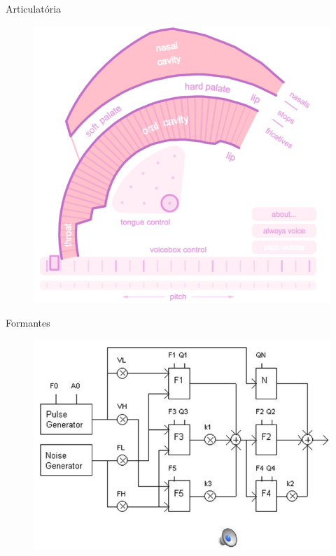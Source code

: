 \documentclass{beamer}
\begin{document}
\begin{frame}{Articulatória}
    \begin{figure}
      \includegraphics[scale=0.30]{pinktrombone.png}
    \end{figure}
\end{frame}

\begin{frame}{Formantes}
    \begin{figure}
      \includegraphics[scale=0.40]{klatt.png}
    \end{figure}
\end{frame}
\end{document}
